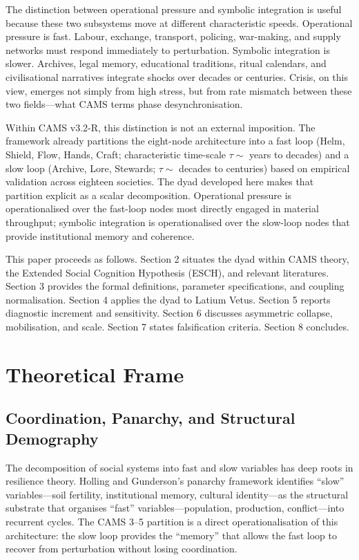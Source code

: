 \documentclass[11pt,a4paper]{article}
\begin{document}
The distinction between operational pressure and symbolic integration is useful because these two subsystems move at different characteristic speeds. Operational pressure is fast. Labour, exchange, transport, policing, war-making, and supply networks must respond immediately to perturbation. Symbolic integration is slower. Archives, legal memory, educational traditions, ritual calendars, and civilisational narratives integrate shocks over decades or centuries. Crisis, on this view, emerges not simply from high stress, but from rate mismatch between these two fields---what CAMS terms phase desynchronisation.

Within CAMS v3.2-R, this distinction is not an external imposition. The framework already partitions the eight-node architecture into a fast loop (Helm, Shield, Flow, Hands, Craft; characteristic time-scale \(\tau\sim\) years to decades) and a slow loop (Archive, Lore, Stewards; \(\tau\sim\) decades to centuries) based on empirical validation across eighteen societies. The dyad developed here makes that partition explicit as a scalar decomposition. Operational pressure is operationalised over the fast-loop nodes most directly engaged in material throughput; symbolic integration is operationalised over the slow-loop nodes that provide institutional memory and coherence.

This paper proceeds as follows. Section 2 situates the dyad within CAMS theory, the Extended Social Cognition Hypothesis (ESCH), and relevant literatures. Section 3 provides the formal definitions, parameter specifications, and coupling normalisation. Section 4 applies the dyad to Latium Vetus. Section 5 reports diagnostic increment and sensitivity. Section 6 discusses asymmetric collapse, mobilisation, and scale. Section 7 states falsification criteria. Section 8 concludes.

\section{Theoretical Frame}

\subsection{Coordination, Panarchy, and Structural Demography}
The decomposition of social systems into fast and slow variables has deep roots in resilience theory. Holling and Gunderson's panarchy framework identifies ``slow'' variables---soil fertility, institutional memory, cultural identity---as the structural substrate that organises ``fast'' variables---population, production, conflict---into recurrent cycles. The CAMS 3--5 partition is a direct operationalisation of this architecture: the slow loop provides the ``memory'' that allows the fast loop to recover from perturbation without losing coordination.
\end{document}
